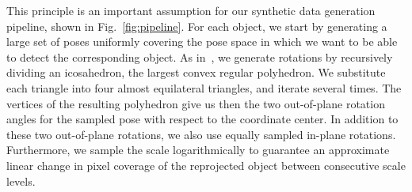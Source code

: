 \documentclass[10pt,twocolumn,letterpaper]{article}
\newcommand{\comment}[1]{}
\begin{document}
This  principle is  an important  assumption for  our synthetic  data generation
pipeline,  shown  in Fig.~\ref{fig:pipeline}.   For  each  object, we  start  by
generating a large  set of poses uniformly  covering the pose space  in which we
want    to    be   able    to    detect    the   corresponding    object.     As
in~\cite{Hinterstoisser12b}, we  generate rotations  by recursively  dividing an
icosahedron, the largest convex regular polyhedron.  We substitute each triangle
into four almost equilateral triangles, and iterate several times.  The vertices
of the  resulting polyhedron give us  then the two out-of-plane  rotation angles
for the  sampled pose  with respect  to the coordinate  center.  In  addition to
these  two  out-of-plane  rotations,  we   also  use  equally  sampled  in-plane
rotations.
Furthermore, we  sample the  scale logarithmically  to guarantee  an approximate
linear change  in pixel coverage  of the reprojected object  between consecutive
scale levels. 
\end{document}
